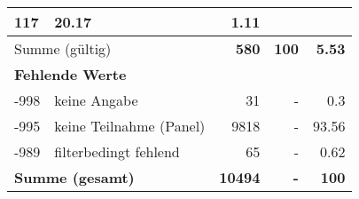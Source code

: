 \begin{longtable}{lXrrr}
       \num{117} &
       \num[round-mode=places,round-precision=2]{20.17} &
         \num[round-mode=places,round-precision=2]{1.11} \\
     \midrule
     \multicolumn{2}{l}{Summe (gültig)} &
       \textbf{\num{580}} &
     \textbf{\num{100}} &
       \textbf{\num[round-mode=places,round-precision=2]{5.53}} \\
     \multicolumn{5}{l}{\textbf{Fehlende Werte}}\\
       -998 &
       keine Angabe &
         \num{31} &
        - &
         \num[round-mode=places,round-precision=2]{0.3} \\
       -995 &
       keine Teilnahme (Panel) &
         \num{9818} &
        - &
         \num[round-mode=places,round-precision=2]{93.56} \\
       -989 &
       filterbedingt fehlend &
         \num{65} &
        - &
         \num[round-mode=places,round-precision=2]{0.62} \\
     \midrule
     \multicolumn{2}{l}{\textbf{Summe (gesamt)}} &
          \textbf{\num{10494}} &
        \textbf{-} &
        \textbf{\num{100}} \\
     \bottomrule
     \end{longtable}
     
